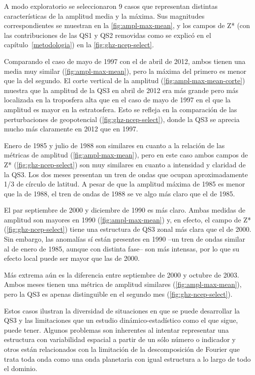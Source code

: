 \documentclass[spanish,a4paper,12p]{book}
\begin{document}
A modo exploratorio se seleccionaron 9 casos que representan distintas
características de la amplitud media y la máxima. Sus magnitudes
correspondientes se muestran en la \autoref{fig:ampl-max-mean}, y los
campos de Z* (con las contribuciones de las QS1 y QS2 removidas como se
explicó en el capítulo~\ref{metodologia}) en la
\autoref{fig:ghz-ncep-select}.

Comparando el caso de mayo de 1997 con el de abril de 2012, ambos tienen
una media muy similar (\autoref{fig:ampl-max-mean}), pero la máxima del
primero es menor que la del segundo. El corte vertical de la amplitud
(\autoref{fig:ampl-max-mean-corte}) muestra que la amplitud de la QS3 en
abril de 2012 era más grande pero más localizada en la troposfera alta
que en el caso de mayo de 1997 en el que la amplitud es mayor en la
estratosfera. Esto se refleja en la comparación de las perturbaciones de
geopotencial (\autoref{fig:ghz-ncep-select}), donde la QS3 se aprecia
mucho más claramente en 2012 que en 1997.

Enero de 1985 y julio de 1988 son similares en cuanto a la relación de
las métricas de amplitud (\autoref{fig:ampl-max-mean}), pero en este
caso ambos campos de Z* (\autoref{fig:ghz-ncep-select}) son muy
similares en cuanto a intensidad y claridad de la QS3. Los dos meses
presentan un tren de ondas que ocupan aproximadamente 1/3 de círculo de
latitud. A pesar de que la amplitud máxima de 1985 es menor que la de
1988, el tren de ondas de 1988 se ve algo más claro que el de 1985.

El par septiembre de 2000 y diciembre de 1990 es más claro. Ambas
medidas de amplitud son mayores en 1990 (\autoref{fig:ampl-max-mean}) y,
en efecto, el campo de Z* (\autoref{fig:ghz-ncep-select}) tiene una
estructura de QS3 zonal más clara que el de 2000. Sin embargo, las
anomalías sí están presentes en 1990 --un tren de ondas similar al de
enero de 1985, aunque con distinta fase-- son más intensas, por lo que
su efecto local puede ser mayor que las de 2000.

Más extrema aún es la diferencia entre septiembre de 2000 y octubre de
2003. Ambos meses tienen una métrica de amplitud similares
(\autoref{fig:ampl-max-mean}), pero la QS3 es apenas distinguible en el
segundo mes (\autoref{fig:ghz-ncep-select}).

Estos casos ilustran la diversidad de situaciones en que se puede
desarrollar la QS3 y las limitaciones que un estudio
dinámico-estadístico como el que sigue, puede tener. Algunos problemas
son inherentes al intentar representar una estructura con variabilidad
espacial a partir de un sólo número o indicador y otros están
relacionados con la limitación de la descomposición de Fourier que trata
toda onda como una onda planetaria con igual estructura a lo largo de
todo el dominio.
\end{document}

